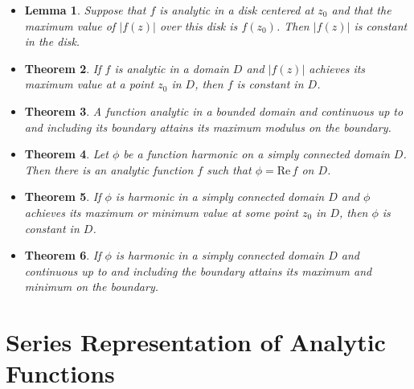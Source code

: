 \documentclass[10pt]{article}
\newtheorem{lemma}{Lemma}[section]
\newtheorem{theorem}[lemma]{Theorem}
\newcommand{\RE}{\mathrm{Re\,}}
\begin{document}
\begin{itemize}
    \item \begin{lemma}
      Suppose that $f$ is analytic in a disk centered at $z_0$ and that the maximum value of $|f(z)|$ over this disk is $f(z_0)$. Then $|f(z)|$ is constant in the disk.
    \end{lemma}

    \item \begin{theorem}
      If $f$ is analytic in a domain $D$ and $|f(z)|$ achieves its maximum value at a point $z_0$ in $D$, then $f$ is constant in $D$.
    \end{theorem}

    \item \begin{theorem}
      A function analytic in a bounded domain and continuous up to and including its boundary attains its maximum modulus on the boundary.
    \end{theorem}

    \item \begin{theorem}
      Let $\phi$ be a function harmonic on a simply connected domain $D$. Then there is an analytic function $f$ such that $\phi = \RE f$ on $D$.
    \end{theorem}

    \item \begin{theorem}
      If $\phi$ is harmonic in a simply connected domain $D$ and $\phi$ achieves its maximum or minimum value at some point $z_0$ in $D$, then $\phi$ is constant in $D$.
    \end{theorem}

    \item \begin{theorem}
      If $\phi$ is harmonic in a simply connected domain $D$ and continuous up to and including the boundary attains its maximum and minimum on the boundary.
    \end{theorem}
  \end{itemize}  

  \section{Series Representation of Analytic Functions} %
  \label{sec:series_representation_of_analytic_functions}
\end{document}
